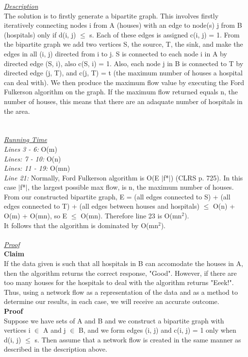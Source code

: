 \documentclass[10pt]{csc_assignment}
\begin{document}
\begin{description}
\begin{algorithm}[H]
\end{algorithm}
\emph{\underline{Description}}\\
The solution is to firstly generate a bipartite graph.
This involves firstly iteratively connecting nodes i from A (houses) with an edge to node(s) j from B (hospitals) only if  d(i, j) $\leqslant$ s. Each of these edges is assigned c(i, j) = 1. From the bipartite graph we add two vertices S, the source, T, the sink, and make the edges in all (i, j) directed from i to j. S is connected to each node i in A by directed edge (S, i), also c(S, i) = 1. Also, each node j in B is connected to T by directed edge (j, T), and c(j, T) = t (the maximum number of houses a hospital can deal with). We then produce the maximum flow value by executing the Ford Fulkerson algorithm on the graph. If the maximum flow returned equals n, the number of houses, this means that there are an adaquate number of hospitals in the area.\\
\\
\\
\emph{\underline{Running Time}}\\
\emph{Lines 3 - 6:} O(m)\\
\emph{Lines: 7 - 10:} O(n)\\
\emph{Lines: 11 - 19:} O(mn)\\
\emph{Line 21:} Normally, Ford Fulkerson algorithm is O(E $\mid$f*$\mid$) (CLRS p. 725). In this case $\mid$f*$\mid$, the largest possible max flow, is n, the maximum number of houses. From our constructed bipartite graph, E = (all edges connected to S) + (all edges connected to T) + (all edges between houses and hospitals) $\leqslant$ O(n) + O(m) + O(mn), so E $\leqslant$ O(mn). Therefore line 23 is O(mn$^{2}$). \\
It follows that the algorithm is dominated by O(mn$^{2}$).\\
\\
\emph{\underline{Proof}}\\
\textbf{Claim}\\
If the data given is such that all hospitals in B can accomodate the houses in A, then the 
algorithm returns the correct response, "Good". However, if there are too many
houses for the hospitals to deal with the algorithm returns "Eeek!". Thus, using a network 
flow as a representation of the data and as a method to determine our results, in each case,
we will receive an accurate outcome.\\
\textbf{Proof}\\
Suppose we have sets of A and B and we construct a bipartite graph with vertices i $\in$ A and j $\in$ B, and we form edges (i, j) and c(i, j) = 1 only when d(i, j) $\leqslant$ s. Then assume that a network flow is created in the same manner as described in the description above.\\

\end{description}
\end{document}
